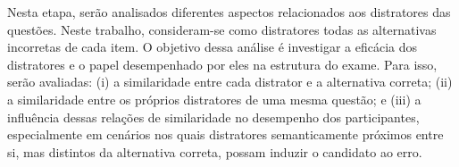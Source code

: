 \documentclass[a4paper,10pt, twocolumn]{article}
\begin{document}
Nesta etapa, serão analisados diferentes aspectos relacionados aos distratores das questões. Neste trabalho, consideram-se como distratores todas as alternativas incorretas de cada item. O objetivo dessa análise é investigar a eficácia dos distratores e o papel desempenhado por eles na estrutura do exame. Para isso, serão avaliadas: (i) a similaridade entre cada distrator e a alternativa correta; (ii) a similaridade entre os próprios distratores de uma mesma questão; e (iii) a influência dessas relações de similaridade no desempenho dos participantes, especialmente em cenários nos quais distratores semanticamente próximos entre si, mas distintos da alternativa correta, possam induzir o candidato ao erro.
\end{document}
